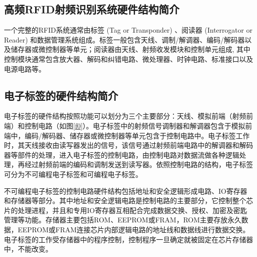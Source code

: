 \documentclass[a4paper]{ctexart}
\begin{document}
\begin{spacing}{1.5}
\songti{}
\section{高频RFID射频识别系统硬件结构简介}
一个完整的RFID系统通常由标签 (Tag or Transponder) 、阅读器 (Interrogator or Reader) 和数据管理系统组成。标签一般包含天线、调制/解调器、编码/解码器以及储存器或微控制器等单元；阅读器由天线、射频收发模块和控制单元组成, 其中控制模块通常包含放大器、解码和纠错电路、微处理器、时钟电路、标准接口以及电源电路等\cite{RN97}。
\subsection{电子标签的硬件结构简介}
电子标签的硬件结构按照功能可以划分为三个主要部分：天线、模拟前端（射频前端）和控制电路（如图\ref{f0}）。电子标签中的射频信号调制器和解调器包含于模拟前端中，编码/解码器、储存器或微控制器等单元包含于控制电路中。电子标签工作时，其天线接收由读写器发出的信号，该信号通过射频前端电路中的解调器和解码器等部件的处理，进入电子标签的控制电路，由控制电路对数据流做各种逻辑处理，再经过射频前端的编码和调制发送到读写器。依照控制电路的结构，电子标签可分为不可编程电子标签和可编程电子标签。

不可编程电子标签的控制电路硬件结构包括地址和安全逻辑形成电路、IO寄存器和存储器等部分。其中地址和安全逻辑电路是控制电路的主要部分，它控制整个芯片的处理进程，并且和专用IO寄存器互相配合完成数据交换、授权、加密及密匙管理等功能。存储器主要包括ROM、EEPROM或FRAM，ROM主要存放永久数据，EEPROM或FRAM连接芯片内部逻辑电路的地址线和数据线进行数据交换。电子标签的工作受存储器中的程序控制，控制程序一旦确定就被固定在芯片存储器中，不能改变\cite{RN98}。


\end{spacing}
\end{document}

